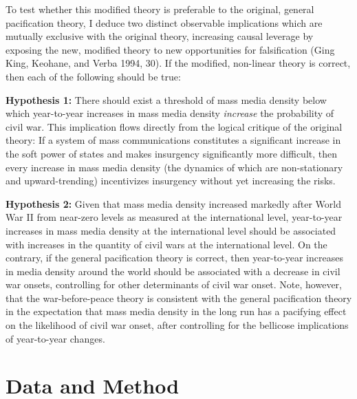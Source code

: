 \documentclass[12pt,article,oneside]{memoir}
\begin{document}
To test whether this modified theory is preferable to the original,
general pacification theory, I deduce two distinct observable
implications which are mutually exclusive with the original theory,
increasing causal leverage by exposing the new, modified theory to new
opportunities for falsification (Ging King, Keohane, and Verba 1994,
30). If the modified, non-linear theory is correct, then each of the
following should be true:

\textbf{Hypothesis 1:} There should exist a threshold of mass media
density below which year-to-year increases in mass media density
\emph{increase} the probability of civil war. This implication flows
directly from the logical critique of the original theory: If a system
of mass communications constitutes a significant increase in the soft
power of states and makes insurgency significantly more difficult, then
every increase in mass media density (the dynamics of which are
non-stationary and upward-trending) incentivizes insurgency without yet
increasing the risks.

\textbf{Hypothesis 2:} Given that mass media density increased markedly
after World War II from near-zero levels as measured at the
international level, year-to-year increases in mass media density at the
international level should be associated with increases in the quantity
of civil wars at the international level. On the contrary, if the
general pacification theory is correct, then year-to-year increases in
media density around the world should be associated with a decrease in
civil war onsets, controlling for other determinants of civil war onset.
Note, however, that the war-before-peace theory is consistent with the
general pacification theory in the expectation that mass media density
in the long run has a pacifying effect on the likelihood of civil war
onset, after controlling for the bellicose implications of year-to-year
changes.

\section{Data and Method}\label{data-and-method}
\end{document}
